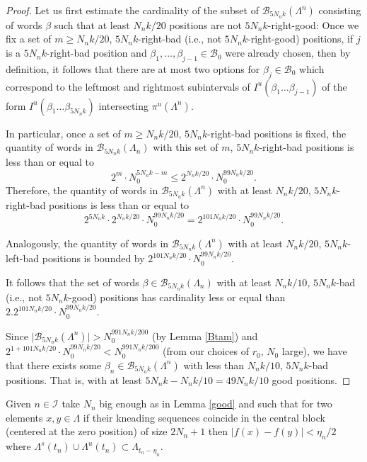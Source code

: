 \documentclass[12pt]{amsart}
\providecommand{\abs}[1]{\lvert#1\rvert}
\theoremstyle{plain} %
\theoremstyle{definition} %
\numberwithin{equation}{section}
\begin{document}
\begin{proof}
Let us first estimate the cardinality of the subset of $\mathcal{B}_{5N_n k}(\Lambda^{n})$ consisting of words $\beta$ such that at least $N_n k/20$ positions are not  $5N_n k$-right-good: Once we fix a set of $m\geq N_n k/20$, $5N_n k$-right-bad (i.e., not  $5N_n k$-right-good) positions, if $j$ is a  $5N_n k$-right-bad position and $\beta_1, \dots, \beta_{j-1}\in\mathcal{B}_0$ were already chosen, then by definition, it follows that there are at most two options for $\beta_j\in\mathcal{B}_0$ which correspond to the leftmost and rightmost subintervals of $I^u(\beta_1\dots\beta_{j-1})$ of the form $I^u(\beta_1\dots\beta_{5N_n k})$ intersecting $\pi^u(\Lambda^n)$.

In particular, once a set of $m\geq N_n k/20$,    $5N_n k$-right-bad positions is fixed, the quantity of words in $\mathcal{B}_{5N_n k}(\Lambda_{n})$ with this set of $m$,  $5N_n k$-right-bad positions is less than or equal to  
$$2^m\cdot N_0^{5N_n k-m}\leq 2^{N_n k/20} \cdot N_0^{99N_n k/20}.$$
Therefore, the quantity of words in $\mathcal{B}_{5N_n k}(\Lambda^{n})$ with at least $N_n k/20$,  $5N_n k$-right-bad positions is less than or equal to
$$2^{5N_n k}\cdot 2^{N_n k/20}\cdot N_0^{99N_n k/20} = 2^{101N_n k/20}\cdot N_0^{99N_n k/20}.$$

Analogously, the quantity of words in $\mathcal{B}_{5N_n k}(\Lambda^{n})$ with at least $N_n k/20$,  $5N_n k$-left-bad positions is bounded by $2^{101N_n k/20}\cdot N_0^{99N_n k/20}$.

It follows that the set of words $\beta \in \mathcal{B}_{5N_n k}(\Lambda_{n})$ with at least $N_n k/10$, 
$5N_n k$-bad (i.e., not  $5N_n k$-good) positions has cardinality less or equal than $2.2^{101N_n k/20}\cdot N_0^{99N_n k/20}$.

Since $\abs{\mathcal{B}_{5N_n k}(\Lambda^{n})}>N_0^{991N_n k/200}$ (by Lemma \ref{Btam}) and $2^{1+101N_n k/20}\cdot N_0^{99N_n k/20}<N_0^{991N_n k/200}$ (from our choices of $r_0$, $N_0$ large), we have that there exists some $\beta_n \in \mathcal{B}_{5N_n k}(\Lambda^{n})$ with less than $N_n k/10$, $5N_n k$-bad positions. That is, with at least $5N_n k-N_n k/10=49N_n k/10$ good positions. 
\end{proof}

Given $n\in \mathcal{I}$ take $N_n$ big enough as in Lemma \ref{good} and such that for two elements $x,y\in \Lambda$ if their kneading sequences coincide in the central block (centered at the zero position) of size $2N_n+1$ then $\abs{f(x)-f(y)}<\eta_n/2$ where $\Lambda^s(t_n)\cup \Lambda^u(t_n) \subset \Lambda_{t_n-{\eta_n}}$.
 
\end{document}
